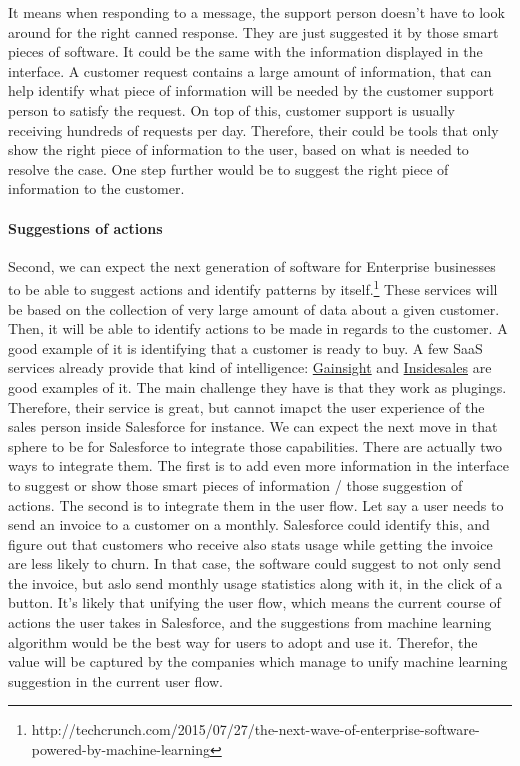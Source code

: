 \documentclass[12pt]{article}
\begin{document}
It means when responding to a message, the support person doesn't have to look around for the right canned response. They are just suggested it by those smart pieces of software.
It could be the same with the information displayed in the interface. A customer request contains a large amount of information, that can help identify what piece of information will be needed by the customer support person to satisfy the request. On top of this, customer support is usually receiving hundreds of requests per day. Therefore, their could be tools that only show the right piece of information to the user, based on what is needed to resolve the case. One step further would be to suggest the right piece of information to the customer.

\paragraph{Suggestions of actions}

Second, we can expect the next generation of software for Enterprise businesses to be able to suggest actions and identify patterns by itself.\footnote{http://techcrunch.com/2015/07/27/the-next-wave-of-enterprise-software-powered-by-machine-learning} These services will be based on the collection of very large amount of data about a given customer. Then, it will be able to identify actions to be made in regards to the customer. A good example of it is identifying that a customer is ready to buy. A few SaaS services already provide that kind of intelligence: \href{http://www.gainsight.com/}{Gainsight} and \href{http://uk.insidesales.com/}{Insidesales} are good examples of it.
The main challenge they have is that they work as plugings. Therefore, their service is great, but cannot imapct the user experience of the sales person inside Salesforce for instance.
We can expect the next move in that sphere to be for Salesforce to integrate those capabilities. There are actually two ways to integrate them. The first is to add even more information in the interface to suggest or show those smart pieces of information / those suggestion of actions. The second is to integrate them in the user flow. Let say a user needs to send an invoice to a customer on a monthly. Salesforce could identify this, and figure out that customers who receive also stats usage while getting the invoice are less likely to churn. In that case, the software could suggest to not only send the invoice, but aslo send monthly usage statistics along with it, in the click of a button.
It's likely that unifying the user flow, which means the current course of actions the user takes in Salesforce, and the suggestions from machine learning algorithm would be the best way for users to adopt and use it. Therefor, the value will be captured by the companies which manage to unify machine learning suggestion in the current user flow.
\end{document}
